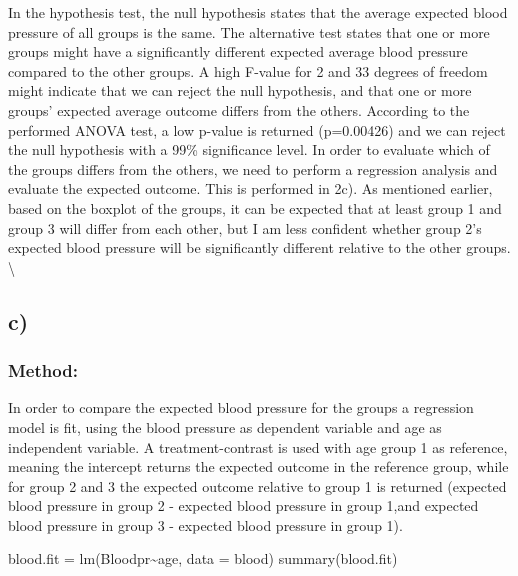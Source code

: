 \documentclass[
]{article}
\newenvironment{Shaded}{\begin{snugshade}}{\end{snugshade}}
\newcommand{\AttributeTok}[1]{\textcolor[rgb]{0.77,0.63,0.00}{#1}}
\newcommand{\FunctionTok}[1]{\textcolor[rgb]{0.00,0.00,0.00}{#1}}
\newcommand{\NormalTok}[1]{#1}
\newcommand{\OtherTok}[1]{\textcolor[rgb]{0.56,0.35,0.01}{#1}}
\newcommand{\SpecialCharTok}[1]{\textcolor[rgb]{0.00,0.00,0.00}{#1}}
\begin{document}
In the hypothesis test, the null hypothesis states that the average
expected blood pressure of all groups is the same. The alternative test
states that one or more groups might have a significantly different
expected average blood pressure compared to the other groups. A high
F-value for 2 and 33 degrees of freedom might indicate that we can
reject the null hypothesis, and that one or more groups' expected
average outcome differs from the others. According to the performed
ANOVA test, a low p-value is returned (p=0.00426) and we can reject the
null hypothesis with a 99\% significance level. In order to evaluate
which of the groups differs from the others, we need to perform a
regression analysis and evaluate the expected outcome. This is performed
in 2c). As mentioned earlier, based on the boxplot of the groups, it can
be expected that at least group 1 and group 3 will differ from each
other, but I am less confident whether group 2's expected blood pressure
will be significantly different relative to the other groups.
\textbackslash{}

\hypertarget{c-1}{%
\subsection{c)}\label{c-1}}

\hypertarget{method-7}{%
\subsubsection{Method:}\label{method-7}}

In order to compare the expected blood pressure for the groups a
regression model is fit, using the blood pressure as dependent variable
and age as independent variable. A treatment-contrast is used with age
group 1 as reference, meaning the intercept returns the expected outcome
in the reference group, while for group 2 and 3 the expected outcome
relative to group 1 is returned (expected blood pressure in group 2 -
expected blood pressure in group 1,and expected blood pressure in group
3 - expected blood pressure in group 1).

\begin{Shaded}
\begin{Highlighting}[]
\NormalTok{blood.fit }\OtherTok{=} \FunctionTok{lm}\NormalTok{(Bloodpr}\SpecialCharTok{\textasciitilde{}}\NormalTok{age, }\AttributeTok{data =}\NormalTok{ blood)}
\FunctionTok{summary}\NormalTok{(blood.fit)}
\end{Highlighting}
\end{Shaded}
\end{document}
